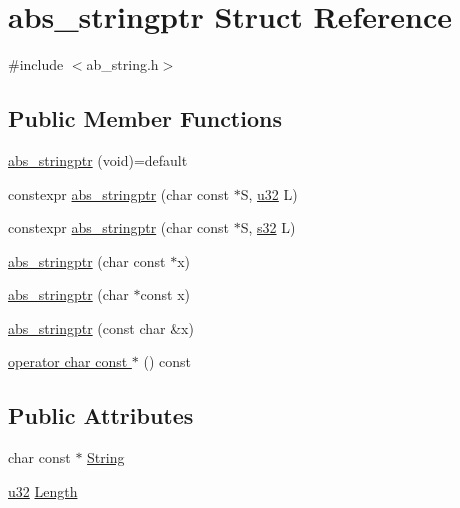 \hypertarget{structabs__stringptr}{}\section{abs\+\_\+stringptr Struct Reference}
\label{structabs__stringptr}


{\ttfamily \#include $<$ab\+\_\+string.\+h$>$}

\subsection*{Public Member Functions}
\begin{DoxyCompactItemize}
\item 
\hyperlink{structabs__stringptr_ad400c488075a59de415ec98ef84aa6fe}{abs\+\_\+stringptr} (void)=default
\item 
constexpr \hyperlink{structabs__stringptr_a9ff62a81f8c16dafb50defa61bd05717}{abs\+\_\+stringptr} (char const $\ast$S, \hyperlink{ab__common_8h_afaa62991928fb9fb18ff0db62a040aba}{u32} L)
\item 
constexpr \hyperlink{structabs__stringptr_ac4b4f641fcefaef4c44e5f9ac7e8d7c9}{abs\+\_\+stringptr} (char const $\ast$S, \hyperlink{ab__common_8h_ae9b1af5c037e57a98884758875d3a7c4}{s32} L)
\item 
\hyperlink{structabs__stringptr_af2ace78c334e1a27966aaf6fd57103e9}{abs\+\_\+stringptr} (char const $\ast$x)
\item 
\hyperlink{structabs__stringptr_acd3fbc548742cd5fc66a8fc6e98b6cdd}{abs\+\_\+stringptr} (char $\ast$const x)
\item 
\hyperlink{structabs__stringptr_a9faeea5e2f5123e1adb68c8da62dc2b9}{abs\+\_\+stringptr} (const char \&x)
\item 
\hyperlink{structabs__stringptr_a7b4d6615fda233343f26a21179f856b7}{operator char const $\ast$} () const
\end{DoxyCompactItemize}
\subsection*{Public Attributes}
\begin{DoxyCompactItemize}
\item 
char const  $\ast$ \hyperlink{structabs__stringptr_ac7296c8ae75a6cf987961712b55acaa5}{String}
\item 
\hyperlink{ab__common_8h_afaa62991928fb9fb18ff0db62a040aba}{u32} \hyperlink{structabs__stringptr_a4b736aa24a8e4591c4efbaac10bd7e9f}{Length}
\end{DoxyCompactItemize}


